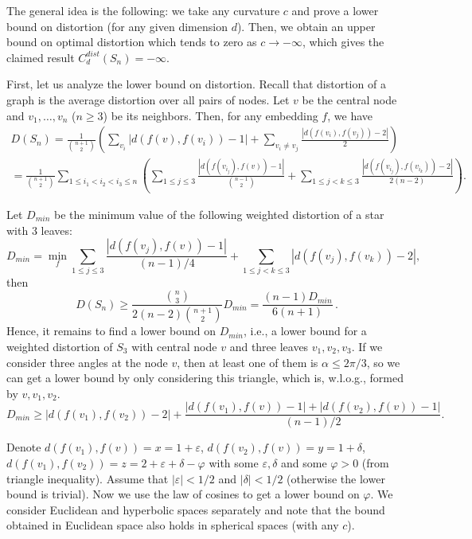 \documentclass{article} %
\begin{document}
The general idea is the following: we take any curvature $c$ and prove a lower bound on distortion (for any given dimension $d$). Then, we obtain an upper bound on optimal distortion which tends to zero as $c \to -\infty$, which gives the claimed result $C_d^{dist}(S_n) = -\infty$.

First, let us analyze the lower bound on distortion. Recall that distortion of a graph is the average distortion over all pairs of nodes. Let $v$ be the central node and $v_1, \ldots, v_n$ ($n \ge 3$) be its neighbors. Then, for any embedding $f$, we have
\begin{multline*}
D(S_n) = \frac{1}{\binom{n+1}{2}} \left( \sum_{v_i} {|d(f(v),f(v_i)) - 1|} + \sum_{v_i \neq v_j} \frac{|d(f(v_i),f(v_j)) - 2|}{2} \right) \\
= \frac{1}{\binom{n+1}{2}} \sum_{1 \le i_1 < i_2 < i_3 \le n} \left(
\sum_{1\le j \le 3}  \frac{|d(f(v_{i_j}),f(v)) - 1|}{{n-1 \choose 2}} +
\sum_{1\le j < k\le 3}  \frac{|d(f(v_{i_j}),f(v_{i_k})) - 2|}{2(n-2)}   \right).
\end{multline*}

Let $D_{min}$ be the minimum value of the following weighted distortion of a star with 3 leaves:
\[
D_{min} = \min_{f} \sum_{1\le j \le 3}  \frac{|d(f(v_j),f(v)) - 1|}{(n-1)/4} +
\sum_{1\le j < k\le 3}  |d(f(v_j),f(v_k)) - 2|,
\]
then 
\begin{equation}\label{eq:D_min}
D(S_n) \ge \frac{{n\choose 3}}{2(n-2){n+1 \choose 2}} D_{min} = \frac{ (n-1)D_{min}}{6(n+1)}\,.
\end{equation}
Hence, it remains to find a lower bound on $D_{min}$, i.e., a lower bound for a weighted distortion of $S_3$ with central node $v$ and three leaves $v_1, v_2, v_3$.
If we consider three angles at the node $v$, then at least one of them is $\alpha \le 2 \pi / 3$, so we can get a lower bound by only considering this triangle, which is, w.l.o.g., formed by $v, v_1, v_2$.
\[
D_{min} \ge  |d(f(v_1),f(v_2)) - 2| + \frac{|d(f(v_1),f(v)) - 1| + |d(f(v_2),f(v)) - 1|}{(n-1)/2}.
\]

Denote $d(f(v_1),f(v)) = x = 1 + \varepsilon$, $d(f(v_2),f(v)) = y = 1 + \delta$, $d(f(v_1),f(v_2)) = z = 2 + \varepsilon + \delta - \varphi$ with some $\varepsilon, \delta$ and some $\varphi > 0$ (from triangle inequality). Assume that $|\varepsilon| < 1/2$ and $|\delta| < 1/2$ (otherwise the lower bound is trivial). Now we use the law of cosines to get a lower bound on $\varphi$.
We consider Euclidean and hyperbolic spaces separately and note that the bound obtained in Euclidean space also holds in spherical spaces (with any $c$).
\end{document}
